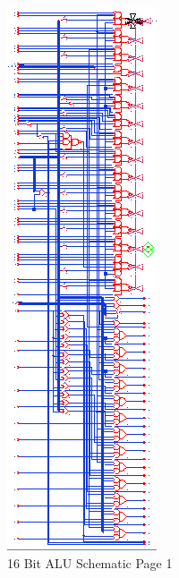 \documentclass[11pt]{article}
\begin{document}
		
		\begin{figure}[H]
			\centering
			\includegraphics[width=0.7\linewidth]{"Pictures/ALU-16Bit Schematic 1"}
			\caption{16 Bit ALU Schematic Page 1}
			\label{fig:alu-16bit-schematic-1}
		\end{figure}
	
\end{document}
